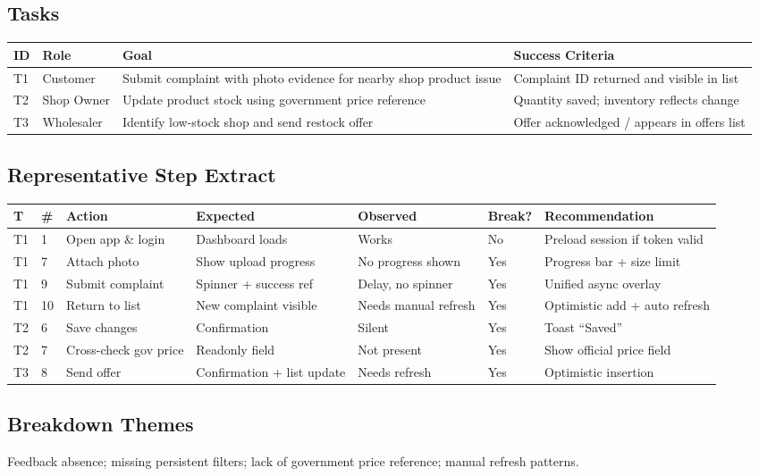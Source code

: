 \documentclass[11pt,a4paper]{article}
\begin{document}
\subsection{Tasks}
\begin{longtable}{@{}L{1.2cm}L{2.5cm}L{6.5cm}L{5cm}@{}}
\toprule
\textbf{ID} & \textbf{Role} & \textbf{Goal} & \textbf{Success Criteria}\\\midrule
T1 & Customer & Submit complaint with photo evidence for nearby shop product issue & Complaint ID returned and visible in list \\
T2 & Shop Owner & Update product stock using government price reference & Quantity saved; inventory reflects change \\
T3 & Wholesaler & Identify low-stock shop and send restock offer & Offer acknowledged / appears in offers list \\
\bottomrule
\end{longtable}

\subsection{Representative Step Extract}
\begin{longtable}{@{}L{0.6cm}L{0.6cm}L{3.4cm}L{3.4cm}L{2.6cm}L{1.1cm}L{3.4cm}@{}}
\toprule
\textbf{T} & \textbf{#} & \textbf{Action} & \textbf{Expected} & \textbf{Observed} & \textbf{Break?} & \textbf{Recommendation}\\\midrule
T1 & 1 & Open app \& login & Dashboard loads & Works & No & Preload session if token valid \\
T1 & 7 & Attach photo & Show upload progress & No progress shown & Yes & Progress bar + size limit \\
T1 & 9 & Submit complaint & Spinner + success ref & Delay, no spinner & Yes & Unified async overlay \\
T1 & 10 & Return to list & New complaint visible & Needs manual refresh & Yes & Optimistic add + auto refresh \\
T2 & 6 & Save changes & Confirmation & Silent & Yes & Toast ``Saved'' \\
T2 & 7 & Cross-check gov price & Readonly field & Not present & Yes & Show official price field \\
T3 & 8 & Send offer & Confirmation + list update & Needs refresh & Yes & Optimistic insertion \\
\bottomrule
\end{longtable}

\subsection{Breakdown Themes}
Feedback absence; missing persistent filters; lack of government price reference; manual refresh patterns.
\end{document}

